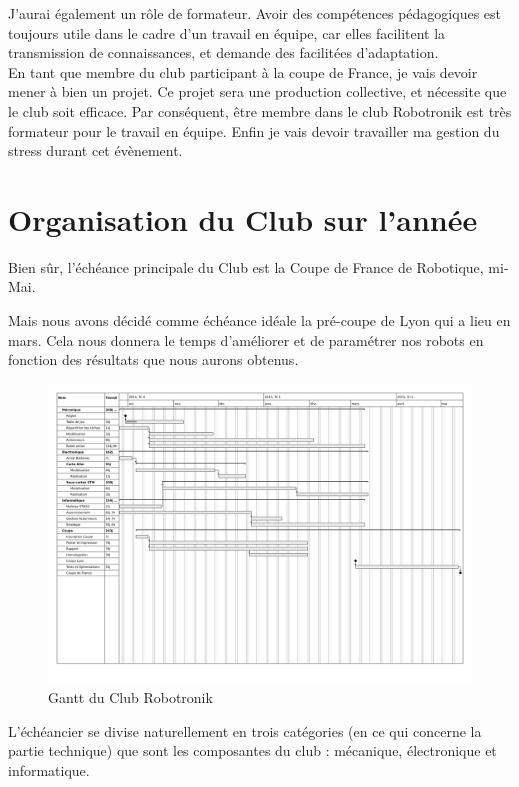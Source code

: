 \documentclass[a4paper,11pt]{article} \usepackage[T1]{fontenc} \usepackage[utf8]{inputenc} \usepackage[francais]{babel}
\begin{document}
J'aurai également un rôle de formateur. Avoir des compétences pédagogiques est toujours utile dans le cadre d'un travail en équipe, car elles facilitent la transmission de connaissances, et demande des facilitées d'adaptation.\\

En tant que membre du club participant à la coupe de France, je vais devoir mener à bien un projet. Ce projet sera une production collective, et nécessite que le club soit efficace. Par conséquent, être membre dans le club Robotronik est très formateur pour le travail en équipe. Enfin je vais devoir travailler ma gestion du stress durant cet évènement.

\part{Organisation du Club sur l'année}
Bien sûr, l'échéance principale du Club est la Coupe de France de Robotique, mi-Mai.

Mais nous avons décidé comme échéance idéale la pré-coupe de Lyon qui a lieu en mars. Cela nous donnera le temps d'améliorer et de paramétrer nos robots en fonction des résultats que nous aurons obtenus.\\
\begin{figure}[h]
    \begin{center}
        \includegraphics[trim=27px 215px 17px 33px,clip=true , width=\textwidth]{Public/GanttRobo.pdf}
        \caption{Gantt du Club Robotronik}
    \end{center}
\end{figure}

L'échéancier se divise naturellement en trois catégories (en ce qui concerne la partie technique) que sont les composantes du club : mécanique, électronique et informatique.
\end{document}
